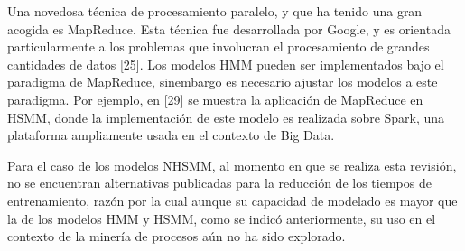 Una novedosa técnica de procesamiento paralelo, y que ha tenido una gran acogida es MapReduce. Esta técnica fue desarrollada por Google, y es orientada particularmente a los problemas que involucran el procesamiento de grandes cantidades de datos [25]. Los modelos HMM pueden ser implementados bajo el paradigma de MapReduce, sinembargo es necesario ajustar los modelos a este paradigma. Por ejemplo, en [29] se muestra la aplicación de MapReduce en HSMM, donde la implementación de este modelo es realizada sobre Spark, una plataforma ampliamente usada en el contexto de Big Data.

Para el caso de los modelos NHSMM, al momento en que se realiza esta revisión, no se encuentran alternativas publicadas para la reducción de los tiempos de entrenamiento, razón por la cual aunque su capacidad de modelado es mayor que la de los modelos HMM y HSMM, como se indicó anteriormente, su uso en el contexto de la minería de procesos aún no ha sido explorado.
